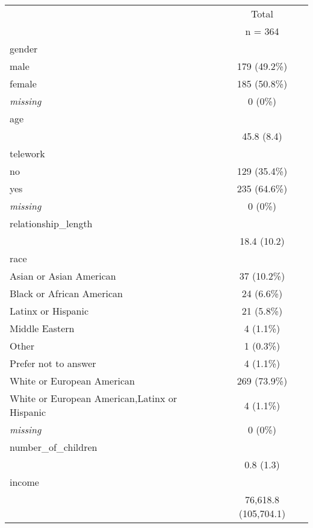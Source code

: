 \documentclass[
  english,
  man]{apa6}
\begin{document}
\renewcommand{\arraystretch}{0.5}
\begin{table}[ ht ] 
\centering 
\caption{}\label{}
\begin{tabular}{ l c }

\toprule
 &   \multicolumn{ 1 }{c}{ Total }\\ 
 & n = 364 \\ 
 \midrule
gender &  \\ 
\hspace{6pt}    male & 179 (49.2\%)\\ 
\hspace{6pt}    female & 185 (50.8\%)\\ 
\hspace{6pt}    \emph{missing} & 0 (0\%)\\ 
age &  \\ 
\hspace{6pt}   & 45.8 (8.4)\\ 
telework &  \\ 
\hspace{6pt}    no & 129 (35.4\%)\\
\hspace{6pt}    yes & 235 (64.6\%)\\ 
\hspace{6pt}    \emph{missing} & 0 (0\%)\\ 
relationship\_length &  \\ 
\hspace{6pt}   & 18.4 (10.2)\\ 
race &  \\ 
\hspace{6pt}    Asian or Asian American & 37 (10.2\%)\\ 
\hspace{6pt}    Black or African American & 24 (6.6\%)\\ 
\hspace{6pt}    Latinx or Hispanic & 21 (5.8\%)\\ 
\hspace{6pt}    Middle Eastern & 4 (1.1\%)\\ 
\hspace{6pt}    Other & 1 (0.3\%)\\ 
\hspace{6pt}    Prefer not to answer & 4 (1.1\%)\\ 
\hspace{6pt}    White or European American & 269 (73.9\%)\\ 
\hspace{6pt}    White or European American,Latinx or Hispanic & 4 (1.1\%)\\ 
\hspace{6pt}    \emph{missing} & 0 (0\%)\\ 
number\_of\_children &  \\ 
\hspace{6pt}   & 0.8 (1.3)\\ 
income &  \\ 
\hspace{6pt}   & 76,618.8 (105,704.1)\\ 
\bottomrule

\end{tabular}
\end{table}
\end{document}
